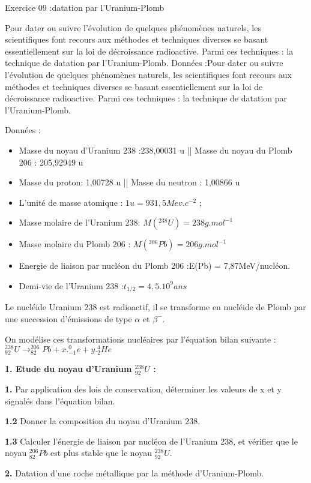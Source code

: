 \documentclass[12pt, french]{article}
\begin{document}
\begin{Box2}{Exercice 09 :datation par l’Uranium-Plomb}

		Pour dater ou suivre l’évolution de quelques phénomènes naturels, les scientifiques font recours aux
méthodes et techniques diverses se basant essentiellement sur la loi de décroissance radioactive.
Parmi ces techniques : la technique de datation par l’Uranium-Plomb.
Données :Pour dater ou suivre l’évolution de quelques phénomènes naturels, les scientifiques font recours aux
méthodes et techniques diverses se basant essentiellement sur la loi de décroissance radioactive.
Parmi ces techniques : la technique de datation par l’Uranium-Plomb.

Données :
\begin{itemize}
	\item Masse du noyau d’Uranium 238 :238,00031 u || Masse du noyau du Plomb 206 : 205,92949 u
	\item Masse du proton: 1,00728 u || Masse du neutron : 1,00866 u
	\item L’unité de masse atomique : $1u = 931,5 Mev.c^{-2}$ ;
	\item Masse molaire de l’Uranium 238: $M(^{238}U) = 238 g.mol^{-1}$
	\item Masse molaire du Plomb 206 : $M(^{206}Pb) = 206 g.mol^{-1}$
	\item Energie de liaison par nucléon du Plomb 206 :E(Pb) = 7,87MeV/nucléon.
	\item  Demi-vie de l’Uranium 238 :$t_{1/2}= 4,5.10^9 ans$
		
\end{itemize}
Le nucléide Uranium 238 est radioactif, il se transforme en nucléide de Plomb par une succession
d’émissions de type $\alpha$ et $\beta^-$. 

On modélise ces transformations nucléaires par l’équation bilan suivante :$^{238}_{92}U \rightarrow ^{206}_{82}Pb + x.^0_{-1}e + y.^4_2He$

\textbf{1. Etude du noyau d’Uranium $^{238}_{92}U$ :}

\textbf{1. }Par application des lois de conservation, déterminer les valeurs de x et y signalés dans
l’équation bilan.

\textbf{1.2} Donner la composition du noyau d’Uranium 238.

\textbf{1.3} Calculer l’énergie de liaison par nucléon de l’Uranium 238, et vérifier que le noyau $^{206}_{82}Pb$ est plus stable que le noyau $^{238}_{92}U$.

\textbf{2. } Datation d’une roche métallique par la méthode d’Uranium-Plomb.


\end{Box2}
\end{document}
